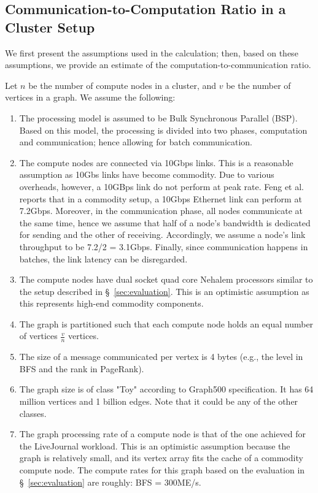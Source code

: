 \subsection{Communication-to-Computation Ratio in a Cluster Setup}
\label{sec:model}
We first present the assumptions used in the calculation; then, based on these assumptions, we provide an estimate of the computation-to-communication ratio. 

Let $n$ be the number of compute nodes in a cluster, and $v$ be the number of vertices in a graph. We assume the following: 

\begin{enumerate}
\item The processing model is assumed to be Bulk Synchronous Parallel (BSP). Based on this model, the processing is divided into two phases, computation and communication; hence allowing for batch communication.

\item The compute nodes are connected via 10Gbps links. This is a reasonable assumption as 10Gbs links have become commodity. Due to various overheads, however, a 10GBps link do not perform at peak rate. Feng et al. \cite{Feng2003} reports that in a commodity setup, a 10Gbps Ethernet link can perform at 7.2Gbps. Moreover, in the communication phase, all nodes communicate at the same time, hence we assume that half of a node's bandwidth is dedicated for sending and the other of receiving. Accordingly, we assume a node's link throughput to be 7.2/2 = 3.1Gbps. Finally, since communication happens in batches, the link latency can be disregarded.

\item The compute nodes have dual socket quad core Nehalem processors similar to the setup described in \S~\ref{sec:evaluation}. This is an optimistic assumption as this represents high-end commodity components.

\item The graph is partitioned such that each compute node holds an equal number of vertices $\frac{v}{n}$ vertices.

\item The size of a message communicated per vertex is 4 bytes (e.g., the level in BFS and the rank in PageRank).

\item The graph size is of class "Toy" according to Graph500 specification. It has 64 million vertices and 1 billion edges. Note that it could be any of the other classes.

\item The graph processing rate of a compute node is that of the one achieved for the LiveJournal workload. This is an optimistic assumption because the graph is relatively small, and its vertex array fits the cache of a commodity compute node. The compute rates for this graph based on the evaluation in \S~\ref{sec:evaluation} are roughly: BFS = 300ME/s.
\end{enumerate}

